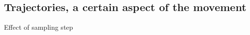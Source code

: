 \documentclass{beamer}\usepackage[]{graphicx}\usepackage[]{color}
\begin{document}
\subsection{Trajectories, a certain aspect of the movement}
\begin{frame}[fragile]{Effect of sampling step}


\end{frame}
\end{document}
